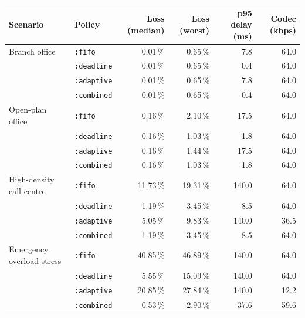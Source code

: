 \begin{tabular}{llrrrr}
\toprule
Scenario & Policy & Loss (median) & Loss (worst) & p95 delay (ms) & Codec (kbps) \\
\midrule
Branch office & \texttt{:fifo} & 0.01\,\% & 0.65\,\% & 7.8 & 64.0 \\
 & \texttt{:deadline} & 0.01\,\% & 0.65\,\% & 0.4 & 64.0 \\
 & \texttt{:adaptive} & 0.01\,\% & 0.65\,\% & 7.8 & 64.0 \\
 & \texttt{:combined} & 0.01\,\% & 0.65\,\% & 0.4 & 64.0 \\
Open-plan office & \texttt{:fifo} & 0.16\,\% & 2.10\,\% & 17.5 & 64.0 \\
 & \texttt{:deadline} & 0.16\,\% & 1.03\,\% & 1.8 & 64.0 \\
 & \texttt{:adaptive} & 0.16\,\% & 1.44\,\% & 17.5 & 64.0 \\
 & \texttt{:combined} & 0.16\,\% & 1.03\,\% & 1.8 & 64.0 \\
High-density call centre & \texttt{:fifo} & 11.73\,\% & 19.31\,\% & 140.0 & 64.0 \\
 & \texttt{:deadline} & 1.19\,\% & 3.45\,\% & 8.5 & 64.0 \\
 & \texttt{:adaptive} & 5.05\,\% & 9.83\,\% & 140.0 & 36.5 \\
 & \texttt{:combined} & 1.19\,\% & 3.45\,\% & 8.5 & 64.0 \\
Emergency overload stress & \texttt{:fifo} & 40.85\,\% & 46.89\,\% & 140.0 & 64.0 \\
 & \texttt{:deadline} & 5.55\,\% & 15.09\,\% & 140.0 & 64.0 \\
 & \texttt{:adaptive} & 20.85\,\% & 27.84\,\% & 140.0 & 12.2 \\
 & \texttt{:combined} & 0.53\,\% & 2.90\,\% & 37.6 & 59.6 \\
\bottomrule
\end{tabular}
